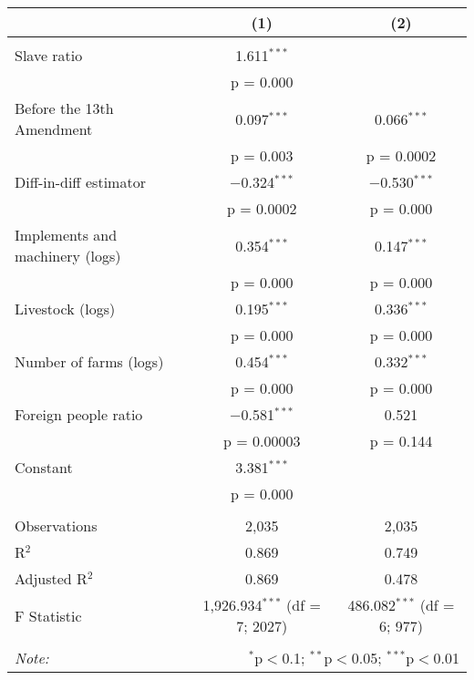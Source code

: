 \documentclass[12pt]{report}
\begin{document}
\begin{table}[!htbp]
\begin{tabular}{@{\extracolsep{5pt}}lcc}
\\[-1.8ex] & (1) & (2)\\ 
\hline \\[-1.8ex] 
 Slave ratio & 1.611$^{***}$ &  \\ 
  & p = 0.000 &  \\ 
  Before the 13th Amendment & 0.097$^{***}$ & 0.066$^{***}$ \\ 
  & p = 0.003 & p = 0.0002 \\ 
  Diff-in-diff estimator & $-$0.324$^{***}$ & $-$0.530$^{***}$ \\ 
  & p = 0.0002 & p = 0.000 \\ 
  Implements and machinery (logs) & 0.354$^{***}$ & 0.147$^{***}$ \\ 
  & p = 0.000 & p = 0.000 \\ 
  Livestock (logs) & 0.195$^{***}$ & 0.336$^{***}$ \\ 
  & p = 0.000 & p = 0.000 \\ 
  Number of farms (logs) & 0.454$^{***}$ & 0.332$^{***}$ \\ 
  & p = 0.000 & p = 0.000 \\ 
  Foreign people ratio & $-$0.581$^{***}$ & 0.521 \\ 
  & p = 0.00003 & p = 0.144 \\ 
  Constant & 3.381$^{***}$ &  \\ 
  & p = 0.000 &  \\ 
 \hline \\[-1.8ex] 
Observations & 2,035 & 2,035 \\ 
R$^{2}$ & 0.869 & 0.749 \\ 
Adjusted R$^{2}$ & 0.869 & 0.478 \\ 
F Statistic & 1,926.934$^{***}$ (df = 7; 2027) & 486.082$^{***}$ (df = 6; 977) \\ 
\hline 
\hline \\[-1.8ex] 
\textit{Note:}  & \multicolumn{2}{r}{$^{*}$p$<$0.1; $^{**}$p$<$0.05; $^{***}$p$<$0.01} \\ 
\end{tabular} 
\end{table} 
\end{document}

